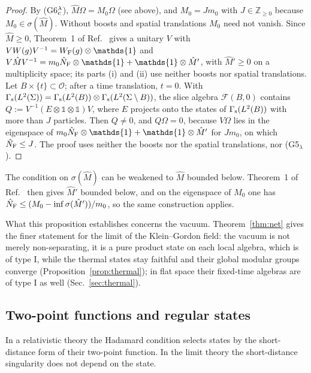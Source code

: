 \documentclass[%
 aip,
 jmp,
 amsmath,amssymb,
 reprint, onecolumn
]{revtex4-1}
\theoremstyle{definition}
\theoremstyle{remark}
\newcommand{\Z}{\mathbb{Z}}
\newcommand{\F}{\mathcal{F}}
\newcommand{\Op}{\mathcal{O}}
\newcommand{\one}{\mathds{1}}
\begin{document}
\begin{proof}
By (G6$_{\rm c}^\lambda$), $\hat M\Omega=M_0\Omega$ (see above), and
$M_0=Jm_0$ with $J\in\Z_{\geq0}$ because $M_0\in\sigma(\hat M)$. Without
boosts and spatial translations $M_0$ need not vanish. Since $\hat M\geq0$,
Theorem~1 of Ref.~
gives a unitary $V$ with $VW(g)V^{-1}=W_{\rm F}(g)\otimes\one$ and
$V\hat MV^{-1}=m_0\hat N_{\rm F}\otimes\one+\one\otimes\hat M'$, with
$\hat M'\geq0$ on a multiplicity space; its parts (i) and (ii) use neither boosts nor spatial
translations. Let $B\times\{t\}\subset\Op$; after a time translation,
$t=0$. With $\Gamma_{\rm s}(L^2(\Sigma))=\Gamma_{\rm s}(L^2(B))\otimes
\Gamma_{\rm s}(L^2(\Sigma\setminus B))$, the slice algebra $\F(B,0)$
contains $Q:=V^{-1}(E\otimes\one\otimes\one)V$, where $E$ projects onto
the states of $\Gamma_{\rm s}(L^2(B))$ with more than $J$ particles.
Then $Q\neq0$, and $Q\Omega=0$, because $V\Omega$ lies in the eigenspace
of $m_0\hat N_{\rm F}\otimes\one+\one\otimes\hat M'$ for $Jm_0$, on
which $\hat N_{\rm F}\leq J$. The proof uses neither the boosts nor the
spatial translations, nor (G5$_\lambda$).
\end{proof}

The condition on $\sigma(\hat M)$ can be weakened to $\hat M$ bounded
below. Theorem~1 of
Ref.~ then gives
$\hat M'$ bounded below, and on the eigenspace of $M_0$ one has
$\hat N_{\rm F}\leq(M_0-\inf\sigma(\hat M'))/m_0$, so the same
construction applies.

What this proposition establishes concerns the vacuum.
Theorem~\ref{thm:net} gives the finer statement for the limit of the
Klein--Gordon field: the vacuum is not merely non-separating, it is a
pure product state on each local algebra, which is of type I, while
the thermal states stay faithful and their global modular groups
converge (Proposition~\ref{prop:thermal}); in flat space their
fixed-time algebras are of type I as well (Sec.~\ref{sec:thermal}).

\subsection{Two-point functions and regular states}\label{sec:NC-regular}

In a relativistic theory the Hadamard condition selects states by the
short-distance form of their two-point function. In the limit theory the
short-distance singularity does not depend on the state.
\end{document}

